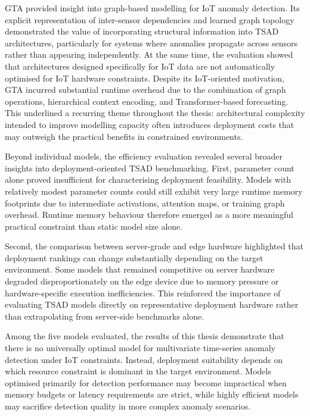\documentclass[twoside,11pt,openright]{report}
\begin{document}
GTA \citep{gta2022} provided insight into graph-based modelling for IoT anomaly detection. Its
explicit representation of inter-sensor dependencies and learned graph topology
demonstrated the value of incorporating structural information into TSAD
architectures, particularly for systems where anomalies propagate across sensors
rather than appearing independently. At the same time, the evaluation showed that
architectures designed specifically for IoT data are not automatically optimised
for IoT hardware constraints. Despite its IoT-oriented motivation, GTA incurred
substantial runtime overhead due to the combination of graph operations,
hierarchical context encoding, and Transformer-based forecasting. This underlined
a recurring theme throughout the thesis: architectural complexity intended to
improve modelling capacity often introduces deployment costs that may outweigh
the practical benefits in constrained environments.

Beyond individual models, the efficiency evaluation revealed several broader
insights into deployment-oriented TSAD benchmarking. First, parameter count alone
proved insufficient for characterising deployment feasibility. Models with
relatively modest parameter counts could still exhibit very large runtime memory
footprints due to intermediate activations, attention maps, or training graph
overhead. Runtime memory behaviour therefore emerged as a more meaningful
practical constraint than static model size alone.

Second, the comparison between server-grade and edge hardware highlighted that
deployment rankings can change substantially depending on the target environment.
Some models that remained competitive on server hardware degraded
disproportionately on the edge device due to memory pressure
or hardware-specific execution inefficiencies. This reinforced the importance of
evaluating TSAD models directly on representative deployment hardware rather than
extrapolating from server-side benchmarks alone.

Among the five models evaluated, the results of this thesis demonstrate that there is no universally
optimal model for multivariate time-series anomaly detection under IoT
constraints. Instead, deployment suitability depends on which resource constraint
is dominant in the target environment. Models optimised primarily for detection
performance may become impractical when memory budgets or latency requirements
are strict, while highly efficient models may sacrifice detection
quality in more complex anomaly scenarios.
\end{document}
